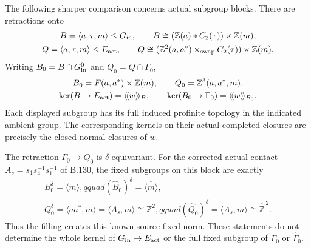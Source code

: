 The following sharper comparison concerns actual subgroup blocks.
There are retractions onto
\begin{equation}\label{eq:B135-blocks}
 \begin{gathered}
 B=\langle a,\tau,m\rangle\leq G_{\rm in},\qquad
 B\cong(\mathbb Z(a)*C_2(\tau))\times\mathbb Z(m),\\
 Q=\langle a,\tau,m\rangle\leq E_{\rm act},\qquad
 Q\cong(\mathbb Z^2(a,a^*)\rtimes_{\rm swap}C_2(\tau))
                  \times\mathbb Z(m).
 \end{gathered}
\end{equation}
Writing $B_0=B\cap G_{\rm in}^0$ and $Q_0=Q\cap\Gamma_0$,
\begin{equation}\label{eq:B135-block-kernels}
 \begin{gathered}
 B_0=F(a,a^*)\times\mathbb Z(m),\qquad Q_0=\mathbb Z^3(a,a^*,m),\\
 \ker(B\to E_{\rm act})=\langle\!\langle w\rangle\!\rangle_B,
 \qquad
 \ker(B_0\to\Gamma_0)=\langle\!\langle w\rangle\!\rangle_{B_0}.
 \end{gathered}
\end{equation}
Each displayed subgroup has its full induced profinite topology
in the indicated ambient group. The corresponding kernels on
their actual completed closures are precisely the closed normal
closures of $w$.

The retraction $\Gamma_0\to Q_0$ is $\delta$-equivariant.
For the corrected actual contact
$A_s=s_1s_4^{-1}s_1^{-1}$ of B.130, the fixed subgroups on this
block are exactly
\begin{equation}\label{eq:B135-fixed-creation}
 \begin{gathered}
 B_0^\delta=\langle m\rangle,qquad
 (\widehat B_0)^\delta=\overline{\langle m\rangle},\\
 Q_0^\delta=\langle aa^*,m\rangle
             =\langle A_s,m\rangle\cong\mathbb Z^2,qquad
 (\widehat Q_0)^\delta
             =\overline{\langle A_s,m\rangle}\cong\widehat{\mathbb Z}^{\,2}.
 \end{gathered}
\end{equation}
Thus the filling creates this known source fixed norm. These
statements do not determine the whole kernel of
$G_{\rm in}\to E_{\rm act}$ or the full fixed subgroup of
$\Gamma_0$ or $\widehat\Gamma_0$.

